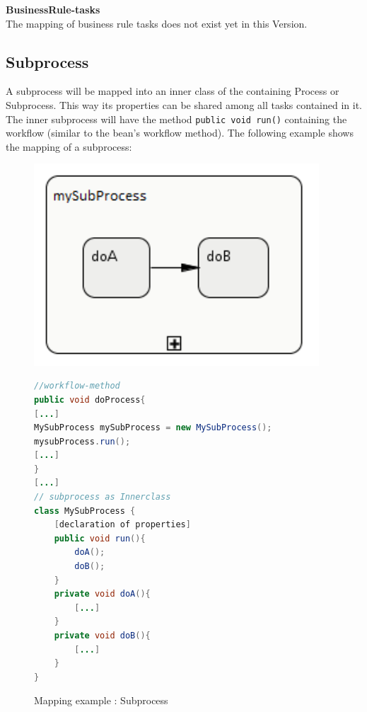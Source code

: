 \textbf{BusinessRule-tasks}\\
The mapping of business rule tasks does not exist yet in this Version.

\subsection{Subprocess}
A subprocess will be mapped into an inner class of the containing Process or Subprocess. This way its properties can be shared among all tasks contained in it. The inner subprocess will have the method \texttt{public void run()} containing the workflow (similar to the bean's workflow method). The following example shows the mapping of a subprocess:\\

\begin{figure}[h]
\begin{minipage}[c]{0.3\textwidth}
\includegraphics[width=0.95\textwidth]{images/mapping/subprocess.png}
\end{minipage}
\begin{minipage}[c]{0.7\textwidth}
\begin{lstlisting}[language=Java]
//workflow-method
public void doProcess{
[...]
MySubProcess mySubProcess = new MySubProcess();
mysubProcess.run();
[...]
}
[...]
// subprocess as Innerclass
class MySubProcess {
	[declaration of properties]		
	public void run(){
		doA();
		doB();
	}
	private void doA(){
		[...] 
	}	
	private void doB(){ 
		[...] 
	}
}
\end{lstlisting}
\end{minipage}
\caption{Mapping example : Subprocess}%
\label{fig:mapping_subprocess}%
\end{figure}

